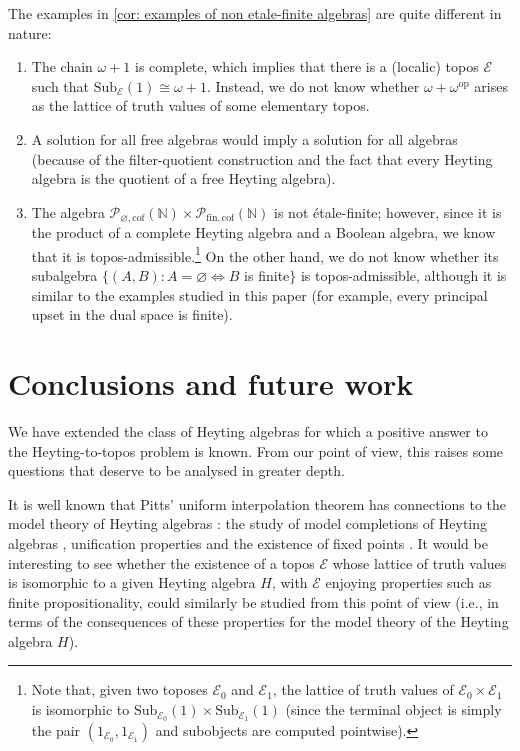 \documentclass[12pt]{amsart}
\theoremstyle{plain}
\theoremstyle{definition}
\newcommand{\N}{\mathbb{N}}
\newcommand{\op}{\mathrm{op}}
\newcommand{\E}{\mathcal{E}}
\newcommand{\Sub}{\mathrm{Sub}}
\newcommand{\cofnaturals}{\mathcal{P}_{\varnothing,\mathrm{cof}}(\N)}
\newcommand{\fincofnaturals}{\mathcal{P}_{\mathrm{fin,cof}}(\N)}
\begin{document}
The examples in \cref{cor: examples of non etale-finite algebras} are quite different in nature:
\begin{enumerate}
    \item 
    The chain $\omega+1$ is complete, which implies that there is a (localic) topos $\E$ such that $\Sub_{\E}(1)\cong \omega+1$. Instead, we do not know whether $\omega+\omega^{\op}$ arises as the lattice of truth values of some elementary topos. 
    \item 
    A solution for all free algebras would imply a solution for all algebras (because of the filter-quotient construction and the fact that every Heyting algebra is the quotient of a free Heyting algebra).
    \item
    The algebra $\cofnaturals\times \fincofnaturals$ is not étale-finite; however, since it is the product of a complete Heyting algebra and a Boolean algebra, we know that it is topos-admissible.\footnote{Note that, given two toposes $\E_{0}$ and $\E_{1}$, the lattice of truth values of $\E_{0}\times \E_{1}$ is isomorphic to $\Sub_{\E_{0}}(1)\times \Sub_{\E_{1}}(1)$ (since the terminal object is simply the pair $(1_{\E_{0}},1_{\E_{1}})$ and subobjects are computed pointwise).}
    On the other hand, we do not know whether its subalgebra $\{(A,B) : A=\varnothing \Leftrightarrow B$ is finite$\}$ is topos-admissible, although it is similar to the examples studied in this paper (for example, every principal upset in the dual space is finite).
\end{enumerate}




\section{Conclusions and future work}

We have extended the class of Heyting algebras for which a positive answer to the Heyting-to-topos problem is known. From our point of view, this raises some questions that deserve to be analysed in greater depth. 

It is well known that Pitts' uniform interpolation theorem \cite{Pitts1992} has connections to the model theory of Heyting algebras \cite{Ghilardi2002}: the study of model completions of Heyting algebras \cite{darnierejunkermodelcompletionofcoheyting}, unification properties \cite{ghilardi_unificationintuitionisticlogic} and the existence of fixed points \cite{Santocanale2018RuitenburgsTV}. It would be interesting to see whether the existence of a topos $\E$ whose lattice of truth values is isomorphic to a given Heyting algebra $H$, with $\E$ enjoying properties such as finite propositionality, could similarly be studied from this point of view (i.e., in terms of the consequences of these properties for the model theory of the Heyting algebra $H$).
\end{document}

